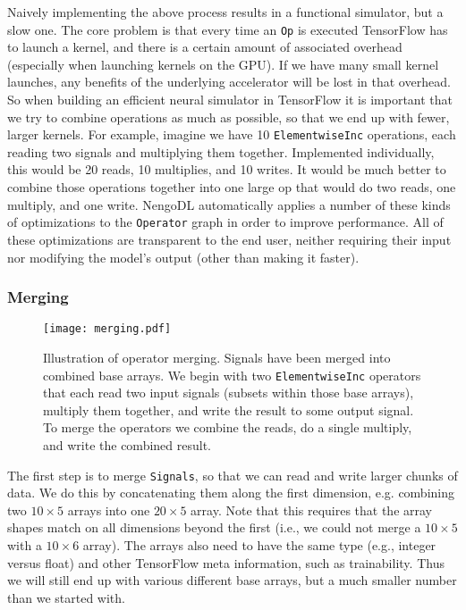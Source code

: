 \documentclass{article}
\begin{document}
Naively implementing the above process results in a functional simulator, but a slow one.  The core problem is that every time an \texttt{Op} is executed TensorFlow has to launch a kernel, and there is a certain amount of associated overhead (especially when launching kernels on the GPU).  If we have many small kernel launches, any benefits of the underlying accelerator will be lost in that overhead.  So when building an efficient neural simulator in TensorFlow it is important that we try to combine operations as much as possible, so that we end up with fewer, larger kernels.  For example, imagine we have 10 \texttt{ElementwiseInc} operations, each reading two signals and multiplying them together.  Implemented individually, this would be 20 reads, 10 multiplies, and 10 writes.  It would be much better to combine those operations together into one large op that would do two reads, one multiply, and one write.  NengoDL automatically applies a number of these kinds of optimizations to the \texttt{Operator} graph in order to improve performance.  All of these optimizations are transparent to the end user, neither requiring their input nor modifying the model's output (other than making it faster).

\subsubsection{Merging}
\label{sec:merging}

\begin{figure}
\centering
\texttt{[image: merging.pdf]}
\caption{Illustration of operator merging.  Signals have been merged into combined base arrays.  We begin with two \texttt{ElementwiseInc} operators that each read two input signals (subsets within those base arrays), multiply them together, and write the result to some output signal.  To merge the operators we combine the reads, do a single multiply, and write the combined result.}
\label{fig:merging}
\end{figure}

The first step is to merge \texttt{Signals}, so that we can read and write larger chunks of data.  We do this by concatenating them along the first dimension, e.g. combining two $10 \times 5$ arrays into one $20 \times 5$ array.  Note that this requires that the array shapes match on all dimensions beyond the first (i.e., we could not merge a $10 \times 5$ with a $10 \times 6$ array).  The arrays also need to have the same type (e.g., integer versus float) and other TensorFlow meta information, such as trainability.  Thus we will still end up with various different base arrays, but a much smaller number than we started with.
\end{document}
